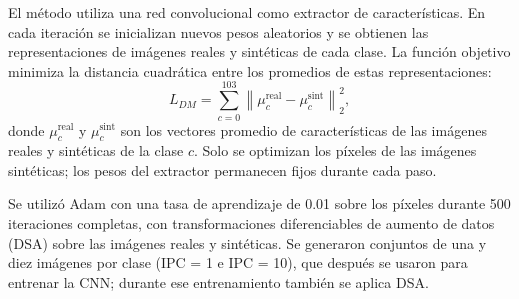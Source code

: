 El método utiliza una red convolucional como extractor de características. En cada iteración se inicializan nuevos pesos aleatorios y se obtienen las representaciones de imágenes reales y sintéticas de cada clase. La función objetivo minimiza la distancia cuadrática entre los promedios de estas representaciones:
\begin{equation}
L_{DM} = \sum_{c=0}^{103} \left\lVert \mu_c^{\text{real}} - \mu_c^{\text{sint}} \right\rVert_2^2,
\end{equation}
donde $\mu_c^{\text{real}}$ y $\mu_c^{\text{sint}}$ son los vectores promedio de características de las imágenes reales y sintéticas de la clase $c$. Solo se optimizan los píxeles de las imágenes sintéticas; los pesos del extractor permanecen fijos durante cada paso.

Se utilizó Adam con una tasa de aprendizaje de 0.01 sobre los píxeles durante 500 iteraciones completas, con transformaciones diferenciables de aumento de datos (DSA) \parencite{zhao2021dsa} sobre las imágenes reales y sintéticas. Se generaron conjuntos de una y diez imágenes por clase (IPC = 1 e IPC = 10), que después se usaron para entrenar la CNN; durante ese entrenamiento también se aplica DSA.
